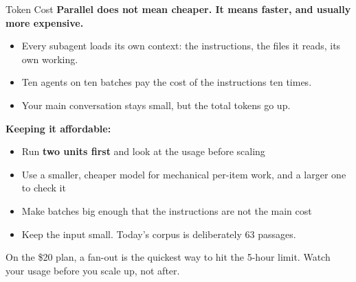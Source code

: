 \documentclass[aspectratio=169, 11pt]{beamer}
\begin{document}
\begin{frame}{Token Cost}
  \textbf{Parallel does not mean cheaper. It means faster, and usually more expensive.}

  \vspace{0.5em}
  \begin{itemize}
    \item Every subagent loads its own context: the instructions, the files it reads, its own working.
    \item Ten agents on ten batches pay the cost of the instructions ten times.
    \item Your main conversation stays small, but the total tokens go up.
  \end{itemize}

  \vspace{0.5em}
  \textbf{Keeping it affordable:}
  \begin{itemize}\small
    \item Run \textbf{two units first} and look at the usage before scaling
    \item Use a smaller, cheaper model for mechanical per-item work, and a larger one to check it
    \item Make batches big enough that the instructions are not the main cost
    \item Keep the input small. Today's corpus is deliberately 63 passages.
  \end{itemize}

  \vspace{0.5em}
  \alert{On the \$20 plan, a fan-out is the quickest way to hit the 5-hour limit. Watch your usage before you scale up, not after.}
\end{frame}
\end{document}

